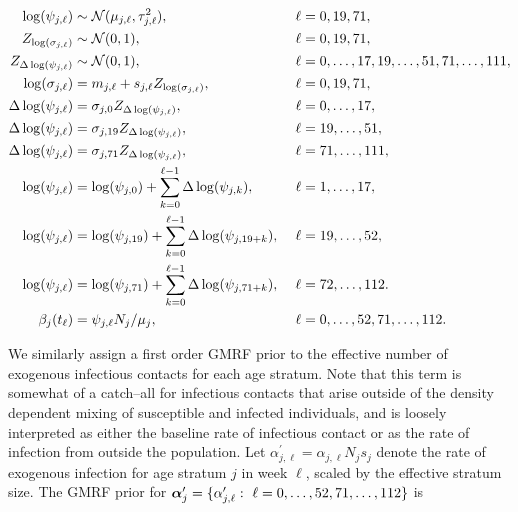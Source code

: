 \begin{footnotesize}
	\begin{align}
	\log(\psi_{j,\ell}) &\sim \mcN(\mu_{j,\ell},\tau_{j,\ell}^2),&\ &\ell= 0,19,71, \nonumber\\
	Z_{\log(\sigma_{j,\ell})} &\sim \mcN(0,1),&\ &\ell=0,19,71, \nonumber \\
	Z_{\Delta\log(\psi_{j,\ell})} &\sim \mcN(0,1),&\ &\ell=0,\dots,17,19,\dots,51,71,\dots,111, \nonumber \\ 
	\log(\sigma_{j,\ell}) &= m_{j,\ell} + s_{j,\ell}Z_{\log(\sigma_{j,\ell})},&\ &\ell = 0,19,71,\nonumber\\
	\Delta\log(\psi_{j,\ell})&= \sigma_{j,0} Z_{\Delta\log(\psi_{j,\ell})},&\ &\ell=0,\dots,17, \nonumber\\
	\Delta\log(\psi_{j,\ell})&= \sigma_{j,19} Z_{\Delta\log(\psi_{j,\ell})},&\ &\ell=19,\dots,51, \nonumber\\
	\Delta\log(\psi_{j,\ell})&= \sigma_{j,71} Z_{\Delta\log(\psi_{j,\ell})},&\ &\ell=71,\dots,111, \nonumber\\
	\log(\psi_{j,\ell}) &= \log(\psi_{j,0}) + \sum_{k=0}^{\ell-1}\Delta\log(\psi_{j,k}),&\ &\ell = 1,\dots,17, \nonumber\\
	\log(\psi_{j,\ell}) &= \log(\psi_{j,19}) + \sum_{k=0}^{\ell-1}\Delta\log(\psi_{j,19+k}),&\ &\ell = 19,\dots,52, \nonumber\\
	\log(\psi_{j,\ell}) &= \log(\psi_{j,71}) + \sum_{k=0}^{\ell-1}\Delta\log(\psi_{j,71+k}),&\ &\ell = 72,\dots,112. \nonumber \\
	\beta_j(t_\ell) &= \psi_{j,\ell}N_j/ \mu_{j},&\ &\ell=0,\dots,52,71,\dots,112. \nonumber
	\end{align}
\end{footnotesize}

We similarly assign a first order GMRF prior to the effective number of exogenous infectious contacts for each age stratum. Note that this term is somewhat of a catch--all for infectious contacts that arise outside of the density dependent mixing of susceptible and infected individuals, and is loosely interpreted as either the baseline rate of infectious contact or as the rate of infection from outside the population. Let $ \alpha^\prime_{j,\ell} = \alpha_{j,\ell}N_js_j $ denote the rate of exogenous infection for age stratum $ j $ in week $ \ell $, scaled by the effective stratum size. The GMRF prior for $ \balpha^\prime_j = \lbrace\alpha^\prime_{j,\ell}:\ \ell=0,\dots,52,71,\dots,112\rbrace $ is

